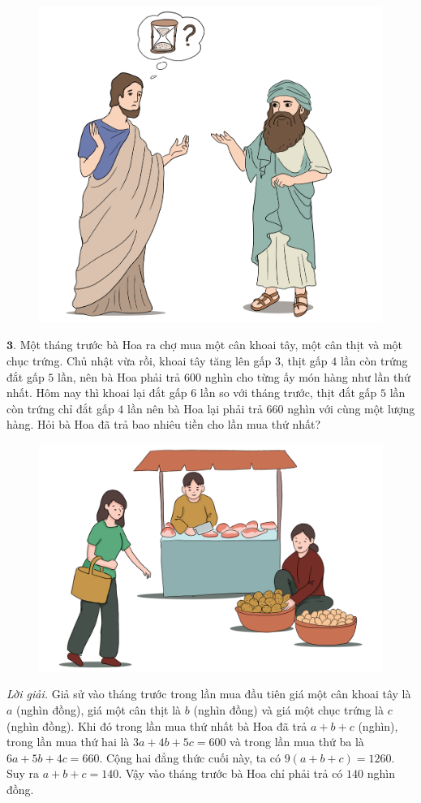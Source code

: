 \begin{multicols}{2}
\begin{figure}[H]
		\centering
		\vspace*{-10pt}
		\captionsetup{labelformat= empty, justification=centering}
		\includegraphics[width=0.6\linewidth]{Pi1_2_Bai2}
		\vspace*{-10pt}
	\end{figure}
	$\pmb{3.}$ Một tháng trước bà Hoa ra chợ mua một cân khoai tây, một cân thịt và một chục trứng. Chủ nhật vừa rồi, khoai tây tăng lên gấp $3$, thịt gấp $4$ lần còn trứng đắt gấp $5$ lần, nên bà Hoa phải trả $600$ nghìn cho từng ấy món hàng như lần thứ nhất. Hôm nay thì khoai lại đắt gấp $6$ lần so với tháng trước, thịt đắt gấp $5$ lần còn trứng chỉ đắt gấp $4$ lần nên bà Hoa lại phải trả $660$ nghìn với cùng một lượng hàng. Hỏi bà Hoa đã trả bao nhiêu tiền cho lần mua thứ nhất?
	\begin{figure}[H]
		\centering
		\vspace*{-10pt}
		\captionsetup{labelformat= empty, justification=centering}
		\includegraphics[width=0.7\linewidth]{Pi1_2_Bai3}
		\vspace*{-10pt}
	\end{figure}
	\textit{Lời giải.} 	Giả sử vào tháng trước trong lần mua đầu tiên giá một cân khoai tây là $a$ (nghìn đồng), giá một cân thịt là $b$ (nghìn đồng) và giá một chục trứng là $c$ (nghìn đồng). Khi đó trong lần mua thứ nhất bà Hoa đã trả $a + b + c$ (nghìn), trong lần mua thứ hai là $3a+4b+5c = 600$ và trong lần mua thứ ba là $6a + 5b+ 4c = 660$. Cộng hai đẳng thức cuối này, ta có $9(a+b+c)= 1260$. Suy ra $a+b+c = 140$. Vậy vào tháng trước bà Hoa chỉ phải trả có $140$ nghìn đồng.

\end{multicols}
